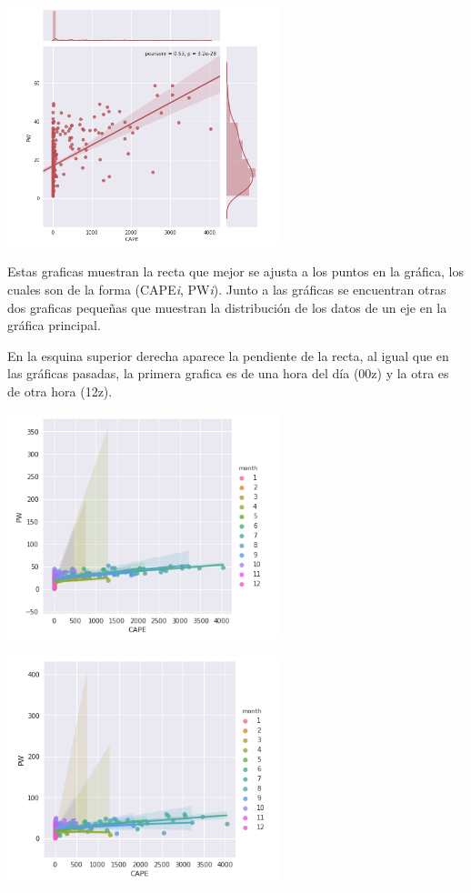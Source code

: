 \documentclass{article}
\begin{document}
\begin{center}
	\includegraphics[width=8cm]{12zJointPlot.png}
 
\end{center}
\vspace{0.3cm}

Estas graficas muestran la recta que mejor se ajusta a los puntos en la gráfica, los cuales son de la forma (CAPE\textit{i}, PW\textit{i}).
Junto a las gráficas se encuentran otras dos graficas pequeñas que muestran la distribución de los datos de un eje en la gráfica principal.

En la esquina superior derecha aparece la pendiente de la recta, al igual que en las gráficas pasadas, la primera grafica es de una hora del día (00z) y la otra es de otra hora (12z). 

\begin{center}
	\includegraphics[width=8cm]{00zLmPlot.png}
 
\end{center}
\vspace{0.3cm}

\begin{center}
	\includegraphics[width=8cm]{12zLmPlot.png}
 
\end{center}
\vspace{0.3cm}
\end{document}
